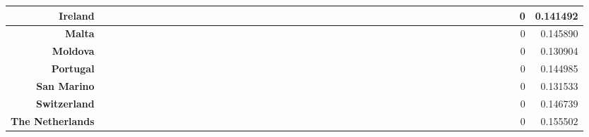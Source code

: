 \documentclass[a4paper,11pt]{report}
\begin{document}
\begin{appendices}
\begin{landscape}
\begin{longtable}{r|r|r|r|r|r|r|r|r|r|r|r|r|r|r|r|r|r|r|r|r|r|r|r|r|r|r|r|r|r|r|r|r|r|r|r|r|r|r|r|r|r|r|r|r|}
\multicolumn{1}{|r|}{\textbf{Ireland}}&&&&&&&&&&&&&&&&&&&&&&&&&&&&&&&&&&&&&&&&&&&0&0.141492\\ \hline
\multicolumn{1}{|r|}{\textbf{Malta}}&&&&&&&&&&&&&&&&&&&&&&&&&&&&&&&&&&&&&&&&&&&0&0.145890\\ \hline
\multicolumn{1}{|r|}{\textbf{Moldova}}&&&&&&&&&&&&&&&&&&&&&&&&&&&&&&&&&&&&&&&&&&&0&0.130904\\ \hline
\multicolumn{1}{|r|}{\textbf{Portugal}}&&&&&&&&&&&&&&&&&&&&&&&&&&&&&&&&&&&&&&&&&&&0&0.144985\\ \hline
\multicolumn{1}{|r|}{\textbf{San Marino}}&&&&&&&&&&&&&&&&&&&&&&&&&&&&&&&&&&&&&&&&&&&0&0.131533\\ \hline
\multicolumn{1}{|r|}{\textbf{Switzerland}}&&&&&&&&&&&&&&&&&&&&&&&&&&&&&&&&&&&&&&&&&&&0&0.146739\\ \hline
\multicolumn{1}{|r|}{\textbf{The Netherlands}}&&&&&&&&&&&&&&&&&&&&&&&&&&&&&&&&&&&&&&&&&&&0&0.155502 
\\ \hline
\end{longtable}

\egroup
\end{landscape}
\end{appendices}


   \newpage


\nocite{*}




\newpage
\printindex
\end{document}
